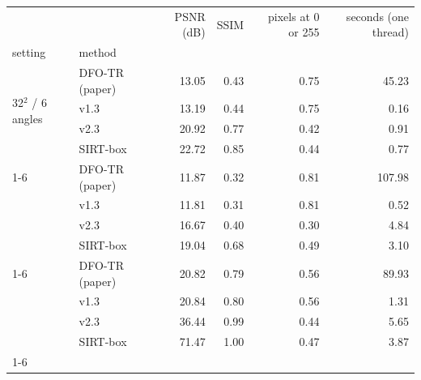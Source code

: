 \begin{tabular}{llrrrr}
\toprule
 &  & PSNR (dB) & SSIM & pixels at 0 or 255 & seconds (one thread) \\
setting & method &  &  &  &  \\
\midrule
\multirow[t]{4}{*}{32$^2$ / 6 angles} & DFO-TR (paper) & 13.05 & 0.43 & 0.75 & 45.23 \\
 & v1.3 & 13.19 & 0.44 & 0.75 & 0.16 \\
 & v2.3 & 20.92 & 0.77 & 0.42 & 0.91 \\
 & SIRT-box & 22.72 & 0.85 & 0.44 & 0.77 \\
\cline{1-6}
\multirow[t]{4}{*}{64$^2$ / 6 angles} & DFO-TR (paper) & 11.87 & 0.32 & 0.81 & 107.98 \\
 & v1.3 & 11.81 & 0.31 & 0.81 & 0.52 \\
 & v2.3 & 16.67 & 0.40 & 0.30 & 4.84 \\
 & SIRT-box & 19.04 & 0.68 & 0.49 & 3.10 \\
\cline{1-6}
\multirow[t]{4}{*}{32$^2$ / 32 angles} & DFO-TR (paper) & 20.82 & 0.79 & 0.56 & 89.93 \\
 & v1.3 & 20.84 & 0.80 & 0.56 & 1.31 \\
 & v2.3 & 36.44 & 0.99 & 0.44 & 5.65 \\
 & SIRT-box & 71.47 & 1.00 & 0.47 & 3.87 \\
\cline{1-6}
\bottomrule
\end{tabular}
